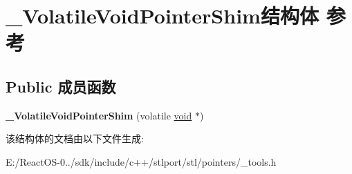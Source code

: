 \hypertarget{struct___volatile_void_pointer_shim}{}\section{\+\_\+\+Volatile\+Void\+Pointer\+Shim结构体 参考}
\label{struct___volatile_void_pointer_shim}
\subsection*{Public 成员函数}
\begin{DoxyCompactItemize}
\item 
\mbox{\label{struct___volatile_void_pointer_shim_a91163cab1834b7443d690b536e95844c}} 
{\bfseries \+\_\+\+Volatile\+Void\+Pointer\+Shim} (volatile \hyperlink{interfacevoid}{void} $\ast$)
\end{DoxyCompactItemize}


该结构体的文档由以下文件生成\+:\begin{DoxyCompactItemize}
\item 
E\+:/\+React\+O\+S-\/0../sdk/include/c++/stlport/stl/pointers/\+\_\+tools.\+h\end{DoxyCompactItemize}
